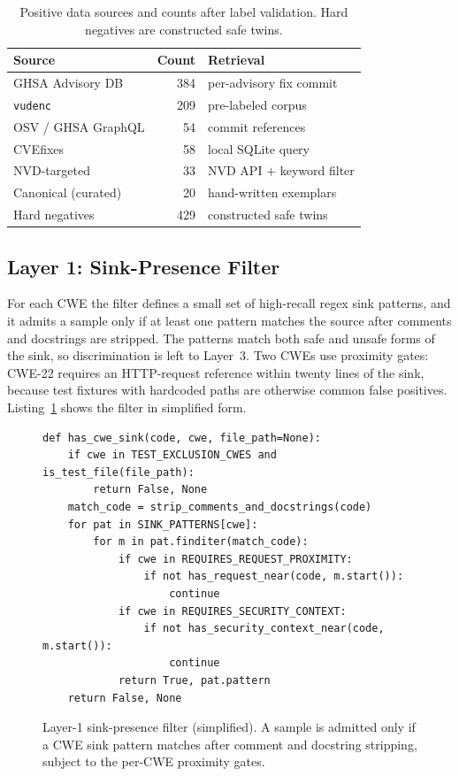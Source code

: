 \begin{table}[htb]
\caption{Positive data sources and counts after label validation. Hard negatives
are constructed safe twins.}
\label{tab:sources}
\centering
\begin{tabular}{lr l}
\toprule
\textbf{Source} & \textbf{Count} & \textbf{Retrieval} \\
\midrule
GHSA Advisory DB    & 384 & per-advisory fix commit \\
\texttt{vudenc}     & 209 & pre-labeled corpus \\
OSV / GHSA GraphQL  &  54 & commit references \\
CVEfixes            &  58 & local SQLite query \\
NVD-targeted        &  33 & NVD API $+$ keyword filter \\
Canonical (curated) &  20 & hand-written exemplars \\
\midrule
Hard negatives      & 429 & constructed safe twins \\
\bottomrule
\end{tabular}
\end{table}

\subsection{Layer 1: Sink-Presence Filter}

For each CWE the filter defines a small set of high-recall regex sink patterns,
and it admits a sample only if at least one pattern matches the source after
comments and docstrings are stripped. The patterns match both safe and unsafe
forms of the sink, so discrimination is left to Layer~3. Two CWEs use proximity
gates: CWE-22 requires an HTTP-request reference within twenty lines of the
sink, because test fixtures with hardcoded paths are otherwise common false
positives. Listing~\ref{lst:sinkfilter} shows the filter in simplified form.

\begin{figure}[H]
\begin{verbatim}
def has_cwe_sink(code, cwe, file_path=None):
    if cwe in TEST_EXCLUSION_CWES and is_test_file(file_path):
        return False, None
    match_code = strip_comments_and_docstrings(code)
    for pat in SINK_PATTERNS[cwe]:
        for m in pat.finditer(match_code):
            if cwe in REQUIRES_REQUEST_PROXIMITY:
                if not has_request_near(code, m.start()):
                    continue
            if cwe in REQUIRES_SECURITY_CONTEXT:
                if not has_security_context_near(code, m.start()):
                    continue
            return True, pat.pattern
    return False, None
\end{verbatim}
\caption{Layer-1 sink-presence filter (simplified). A sample is admitted only if
a CWE sink pattern matches after comment and docstring stripping, subject to the
per-CWE proximity gates.}
\label{lst:sinkfilter}
\end{figure}

